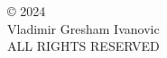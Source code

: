 
\thispagestyle{empty}

\begin{vplace}[100]
  \begin{center}
    \noindent%
    © 2024\\
    Vladimir Gresham Ivanovic\\
    ALL RIGHTS RESERVED\\
  \end{center}
\end{vplace}
 
